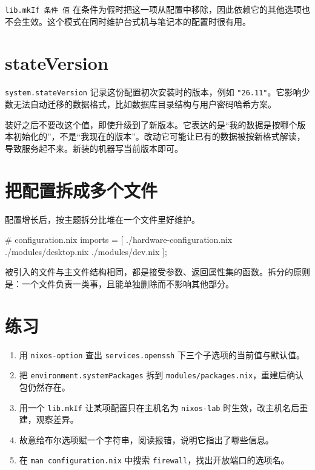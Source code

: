 
\texttt{lib.mkIf 条件 值} 在条件为假时把这一项从配置中移除，因此依赖它的其他选项也不会生效。这个模式在同时维护台式机与笔记本的配置时很有用。

\section{stateVersion}

\texttt{system.stateVersion} 记录这份配置初次安装时的版本，例如 \texttt{"26.11"}。它影响少数无法自动迁移的数据格式，比如数据库目录结构与用户密码哈希方案。

装好之后不要改这个值，即使升级到了新版本。它表达的是“我的数据是按哪个版本初始化的”，不是“我现在的版本”。改动它可能让已有的数据被按新格式解读，导致服务起不来。新装的机器写当前版本即可。

\section{把配置拆成多个文件}

配置增长后，按主题拆分比堆在一个文件里好维护。

\begin{nixcode}
# configuration.nix
{
  imports = [
    ./hardware-configuration.nix
    ./modules/desktop.nix
    ./modules/dev.nix
  ];
}
\end{nixcode}

被引入的文件与主文件结构相同，都是接受参数、返回属性集的函数。拆分的原则是：一个文件负责一类事，且能单独删除而不影响其他部分。

\section{练习}

\begin{enumerate}
  \item 用 \texttt{nixos-option} 查出 \texttt{services.openssh} 下三个子选项的当前值与默认值。
  \item 把 \texttt{environment.\allowbreak{}systemPackages} 拆到 \texttt{modules/packages.nix}，重建后确认包仍然存在。
  \item 用一个 \texttt{lib.mkIf} 让某项配置只在主机名为 \texttt{nixos-lab} 时生效，改主机名后重建，观察差异。
  \item 故意给布尔选项赋一个字符串，阅读报错，说明它指出了哪些信息。
  \item 在 \texttt{man configuration.nix} 中搜索 \texttt{firewall}，找出开放端口的选项名。
\end{enumerate}


